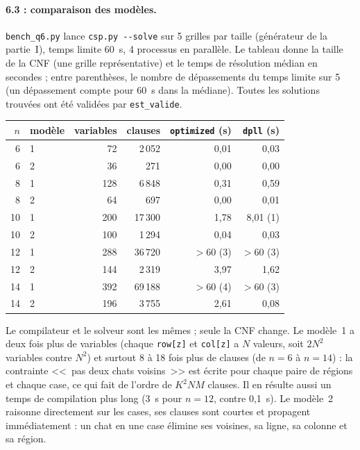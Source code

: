 \documentclass[11pt,a4paper]{article}
\newcommand{\f}[1]{\texttt{#1}}
\begin{document}
\paragraph{6.3 : comparaison des modèles.} \f{bench\_q6.py} lance \f{csp.py -{}-solve} sur 5 grilles par taille (générateur de la partie~I), temps limite 60~s, 4 processus en parallèle. Le tableau donne la taille de la CNF (une grille représentative) et le temps de résolution médian en secondes ; entre parenthèses, le nombre de dépassements du temps limite sur 5 (un dépassement compte pour 60~s dans la médiane). Toutes les solutions trouvées ont été validées par \f{est\_valide}.

\begin{center}
\small
\begin{tabular}{rlrrrr}
\toprule
$n$ & modèle & variables & clauses & \f{optimized} (s) & \f{dpll} (s)\\
\midrule
6  & 1    & 72  & 2\,052  & 0,01 & 0,03\\
6  & 2    & 36  & 271     & 0,00 & 0,00\\
8  & 1    & 128 & 6\,848  & 0,31 & 0,59\\
8  & 2    & 64  & 697     & 0,00 & 0,01\\
10 & 1    & 200 & 17\,300 & 1,78 & 8,01 (1)\\
10 & 2    & 100 & 1\,294  & 0,04 & 0,03\\
12 & 1    & 288 & 36\,720 & $>60$ (3) & $>60$ (3)\\
12 & 2    & 144 & 2\,319  & 3,97 & 1,62\\
14 & 1    & 392 & 69\,188 & $>60$ (4) & $>60$ (3)\\
14 & 2    & 196 & 3\,755  & 2,61 & 0,08\\
\bottomrule
\end{tabular}
\end{center}

Le compilateur et le solveur sont les mêmes ; seule la CNF change. Le modèle~1 a deux fois plus de variables (chaque \f{row[z]} et \f{col[z]} a $N$ valeurs, soit $2N^2$ variables contre $N^2$) et surtout 8 à 18 fois plus de clauses (de $n=6$ à $n=14$) : la contrainte <<~pas deux chats voisins~>> est écrite pour chaque paire de régions et chaque case, ce qui fait de l'ordre de $K^2NM$ clauses. Il en résulte aussi un temps de compilation plus long (3~s pour $n=12$, contre 0,1~s). Le modèle~2 raisonne directement sur les cases, ses clauses sont courtes et propagent immédiatement : un chat en une case élimine ses voisines, sa ligne, sa colonne et sa région.
\end{document}
